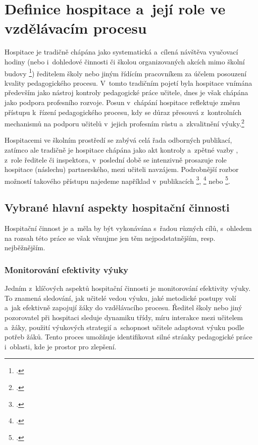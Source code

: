 \setcounter{page}{1}

\section{Definice hospitace a~její role ve vzdělávacím procesu}

Hospitace je tradičně chápána jako systematická a~cílená návštěva vyučovací hodiny (nebo i~dohledové činnosti či školou organizovaných akcích mimo školní budovy \footcite{hospitace-funkce}) ředitelem školy nebo jiným řídícím pracovníkem za účelem posouzení kvality pedagogického procesu. V~tomto tradičním pojetí byla hospitace vnímána především jako nástroj kontroly pedagogické práce učitele, dnes je však chápána jako podpora profesního rozvoje. Posun v~chápání hospitace reflektuje změnu přístupu k~řízení pedagogického procesu, kdy se důraz přesouvá z~kontrolních mechanismů na podporu učitelů v~jejich profesním růstu a~zkvalitnění výuky.\footcite[1]{ped-proces-rizeni}

Hospitacemi ve školním prostředí se zabývá celá řada odborných publikací, zatímco ale tradičně je hospitace chápána jako akt kontroly a~zpětné vazby , z~role ředitele či inspektora, v~poslední době se intenzivně prosazuje  role hospitace (náslechu) partnerského, mezi učiteli navzájem. Podrobnější rozbor možností takového přístupu najedeme například v~publikacích \footcite{ucime-ucit-se}, \footcite{metody-a-formy} nebo \footcite{rozvijejici-hospotace}. 

\subsection{Vybrané hlavní aspekty hospitační činnosti}

Hospitační činnost je a~měla by být vykonávána s~řadou různých cílů, s~ohledem na rozsah této práce se však věnujme jen těm nejpodstatnějším, resp. nejběžnějším.

\subsubsection{Monitorování efektivity výuky}

Jedním z~klíčových aspektů hospitační činnosti je monitorování efektivity výuky. To znamená sledování, jak učitelé vedou výuku, jaké metodické postupy volí a~jak efektivně zapojují žáky do vzdělávacího procesu. Ředitel školy nebo jiný pozorovatel při hospitaci sleduje dynamiku třídy, míru interakce mezi učitelem a~žáky, použití výukových strategií a~schopnost učitele adaptovat výuku podle potřeb žáků. Tento proces umožňuje identifikovat silné stránky pedagogické práce i~oblasti, kde je prostor pro zlepšení.

